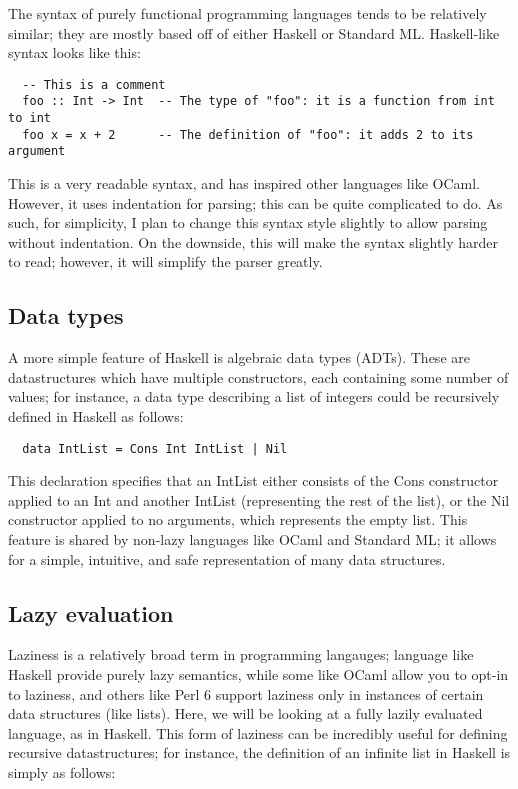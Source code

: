 \documentclass[9pt]{extarticle}
\begin{document}
The syntax of purely functional programming languages tends to be relatively
similar; they are mostly based off of either Haskell or Standard ML.
Haskell-like syntax looks like this:

\begin{verbatim}
  -- This is a comment
  foo :: Int -> Int  -- The type of "foo": it is a function from int to int
  foo x = x + 2      -- The definition of "foo": it adds 2 to its argument
\end{verbatim}

This is a very readable syntax, and has inspired other languages like OCaml.
However, it uses indentation for parsing; this can be quite complicated to do.
As such, for simplicity, I plan to change this syntax style slightly to allow
parsing without indentation. On the downside, this will make the syntax slightly
harder to read; however, it will simplify the parser greatly.

\subsection{Data types}

A more simple feature of Haskell is algebraic data types (ADTs). These are
datastructures which have multiple constructors, each containing some number of
values; for instance, a data type describing a list of integers could be
recursively defined in Haskell as follows: 

\begin{verbatim}
  data IntList = Cons Int IntList | Nil 
\end{verbatim}

This declaration specifies that an IntList either consists of the Cons
constructor applied to an Int and another IntList (representing the rest of the
list), or the Nil constructor applied to no arguments, which represents the
empty list. This feature is shared by non-lazy languages like OCaml and Standard
ML; it allows for a simple, intuitive, and safe representation of many data
structures. 

\subsection{Lazy evaluation}

Laziness is a relatively broad term in programming langauges; language like
Haskell provide purely lazy semantics, while some like OCaml allow you to opt-in
to laziness, and others like Perl 6 support laziness only in instances of
certain data structures (like lists). Here, we will be looking at a fully lazily
evaluated language, as in Haskell. This form of laziness can be incredibly
useful for defining recursive datastructures; for instance, the definition of an
infinite list in Haskell is simply as follows: 
\end{document}
